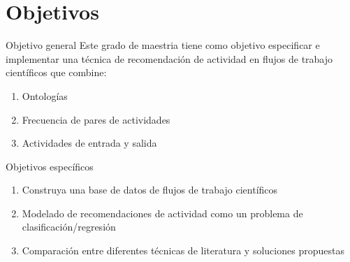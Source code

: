 \section{Objetivos}
	\begin{frame}
		\begin{block}{Objetivo general}
			Este grado de maestria tiene como objetivo especificar e implementar una técnica de recomendación de actividad en flujos de trabajo científicos que combine: 
				\begin{enumerate}
					\item Ontologías
					\item Frecuencia de pares de actividades
					\item Actividades de entrada y salida
				\end{enumerate}
		\end{block}
	\end{frame}

\begin{frame}
	\begin{block}{Objetivos específicos}
		\begin{enumerate}
			\item Construya una base de datos de flujos de trabajo científicos
			\item Modelado de recomendaciones de actividad como un problema de clasificación/regresión
			\item Comparación entre diferentes técnicas de literatura y soluciones propuestas
		\end{enumerate}
	\end{block}
\end{frame}